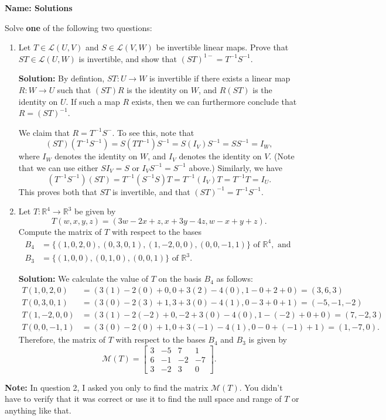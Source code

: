 \documentclass[12pt]{article}
\newcommand{\R}{\mathbb{R}}
\begin{document}
\thispagestyle{fancy}
{\bf Name: Solutions}

\bigskip

Solve {\bf one} of the following two questions:
 \begin{enumerate}
 \item  Let $T\in \mathcal{L}(U,V)$ and $S\in \mathcal{L}(V,W)$ be invertible linear maps. Prove that $ST\in \mathcal{L}(U,W)$ is invertible, and show that $(ST)^{1-} = T^{-1}S^{-1}$.

\bigskip

{\bf Solution:} By defintion, $ST:U\to W$ is invertible if there exists a linear map $R:W\to U$ such that $(ST)R$ is the identity on $W$, and $R(ST)$ is the identity on $U$. If such a map $R$ exists, then we can furthermore conclude that $R=(ST)^{-1}$.

We claim that $R=T^{-1}S^{-}$. To see this, note that
\[
 (ST)(T^{-1}S^{-1}) = S(TT^{-1})S^{-1} = S(I_V)S^{-1} = SS^{-1} = I_W,
\]
where $I_W$ denotes the identity on $W$, and $I_V$ denotes the identity on $V$. (Note that we can use either $SI_V = S$ or $I_VS^{-1}=S^{-1}$ above.) Similarly, we have
\[
 (T^{-1}S^{-1})(ST) = T^{-1}(S^{-1}S)T = T^{-1}(I_V)T = T^{-1}T = I_U.
\]
This proves both that $ST$ is invertible, and that $(ST)^{-1} = T^{-1}S^{-1}$.

\bigskip

 \item Let $T:\R^4\to \R^3$ be given by
\[
 T(w,x,y,z) = (3w-2x+z,x+3y-4z,w-x+y+z).
\]
 Compute the matrix of $T$ with respect to the bases
\begin{align*}
 B_4 &= \{(1,0,2,0),(0,3,0,1), (1, -2, 0, 0), (0,0,-1,1)\} \text{ of } \R^4, \text{ and }\\
 B_3 &= \{(1,0,0),(0,1,0), (0,0,1)\} \text{ of } \R^3.
\end{align*}

\bigskip

{\bf Solution:} We calculate the value of $T$ on the basis $B_4$ as follows:
\begin{align*}
 T(1,0,2,0) &= (3(1)-2(0)+0,0+3(2)-4(0), 1-0+2+0) = (3,6,3)\\
 T(0,3,0,1) &= (3(0)-2(3)+1,3+3(0)-4(1),0-3+0+1) = (-5, -1, -2)\\
 T(1,-2,0,0) &= (3(1)-2(-2)+0, -2+3(0)-4(0), 1-(-2)+0+0) = (7, -2, 3)\\
 T(0,0,-1,1) &= (3(0)-2(0)+1,0+3(-1)-4(1), 0-0+(-1)+1) = (1, -7, 0).
\end{align*}
Therefore, the matrix of $T$ with respect to the bases $B_4$ and $B_3$ is given by
\[
 \mathcal{M}(T) = \begin{bmatrix}3&-5&7&1\\6&-1&-2&-7\\3&-2&3&0\end{bmatrix}.
\]

 \end{enumerate}
{\bf Note:} In question 2, I asked you only to find the matrix $\mathcal{M}(T)$. You didn't have to verify that it was correct or use it to find the null space and range of $T$ or anything like that.
\end{document}
